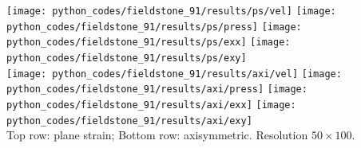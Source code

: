 \begin{center}
\texttt{[image: python\_codes/fieldstone\_91/results/ps/vel]}
\texttt{[image: python\_codes/fieldstone\_91/results/ps/press]}
\texttt{[image: python\_codes/fieldstone\_91/results/ps/exx]}
\texttt{[image: python\_codes/fieldstone\_91/results/ps/exy]}\\
\texttt{[image: python\_codes/fieldstone\_91/results/axi/vel]}
\texttt{[image: python\_codes/fieldstone\_91/results/axi/press]}
\texttt{[image: python\_codes/fieldstone\_91/results/axi/exx]}
\texttt{[image: python\_codes/fieldstone\_91/results/axi/exy]}\\
{\captionfont Top row: plane strain; Bottom row: axisymmetric. Resolution $50\times 100$.}
\end{center}


